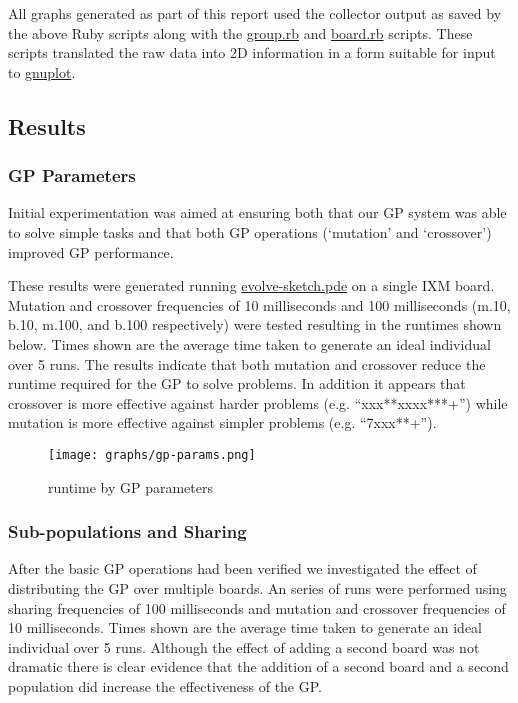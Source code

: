 \documentclass[11pt]{article}
\begin{document}
All graphs generated as part of this report used the collector output
as saved by the above Ruby scripts along with the \href{file:///nfs/adaptive/eschulte/src/gp4ixm-report/src/group.rb}{group.rb} and
\href{file:///nfs/adaptive/eschulte/src/gp4ixm-report/src/board.rb}{board.rb} scripts.  These scripts translated the raw data into 2D
information in a form suitable for input to \href{http://www.gnuplot.info/}{gnuplot}.

\subsection*{Results}
\label{sec-1.5}

\subsubsection*{GP Parameters}
\label{sec-1.5.1}

Initial experimentation was aimed at ensuring both that our GP system
was able to solve simple tasks and that both GP operations (`mutation'
and `crossover') improved GP performance.

These results were generated running \href{file:///nfs/adaptive/eschulte/src/gp4ixm-report/src/evolve-sketch.pde}{evolve-sketch.pde} on a single IXM
board.  Mutation and crossover frequencies of 10 milliseconds and 100
milliseconds (m.10, b.10, m.100, and b.100 respectively) were tested
resulting in the runtimes shown below.  Times shown are the average
time taken to generate an ideal individual over 5 runs.  The results
indicate that both mutation and crossover reduce the runtime required
for the GP to solve problems.  In addition it appears that crossover
is more effective against harder problems (e.g. ``xxx**xxxx***+'') while
mutation is more effective against simpler problems (e.g. ``7xxx**+'').



\begin{figure}[htb]
\centering
\texttt{[image: graphs/gp-params.png]}
\caption{runtime by GP parameters}
\end{figure}

\subsubsection*{Sub-populations and Sharing}
\label{sec-1.5.2}

After the basic GP operations had been verified we investigated the
effect of distributing the GP over multiple boards.  An series of runs
were performed using sharing frequencies of 100 milliseconds and
mutation and crossover frequencies of 10 milliseconds.  Times shown
are the average time taken to generate an ideal individual over 5
runs.  Although the effect of adding a second board was not dramatic
there is clear evidence that the addition of a second board and a
second population did increase the effectiveness of the GP.
\end{document}
